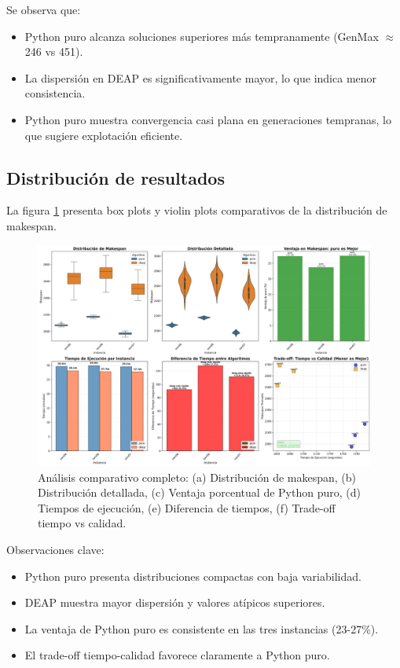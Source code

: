 \documentclass[12pt,a4paper]{article}
\begin{document}
Se observa que:
\begin{itemize}
    \item Python puro alcanza soluciones superiores más tempranamente (GenMax $\approx$ 246 vs 451).
    \item La dispersión en DEAP es significativamente mayor, lo que indica menor consistencia.
    \item Python puro muestra convergencia casi plana en generaciones tempranas, lo que sugiere explotación eficiente.
\end{itemize}

\subsection{Distribución de resultados}

La figura \ref{fig:distribucion} presenta box plots y violin plots comparativos de la distribución de makespan.

\begin{landscape}
\begin{figure}[H]
    \centering
    \includegraphics[width=\textwidth]{Figuras/comparativa_completa.png}
    \caption{Análisis comparativo completo: (a) Distribución de makespan, (b) Distribución detallada, (c) Ventaja porcentual de Python puro, (d) Tiempos de ejecución, (e) Diferencia de tiempos, (f) Trade-off tiempo vs calidad.}
    \label{fig:distribucion}
\end{figure}
\end{landscape}

Observaciones clave:
\begin{itemize}
    \item Python puro presenta distribuciones compactas con baja variabilidad.
    \item DEAP muestra mayor dispersión y valores atípicos superiores.
    \item La ventaja de Python puro es consistente en las tres instancias (23-27\%).
    \item El trade-off tiempo-calidad favorece claramente a Python puro.
\end{itemize}
\end{document}
